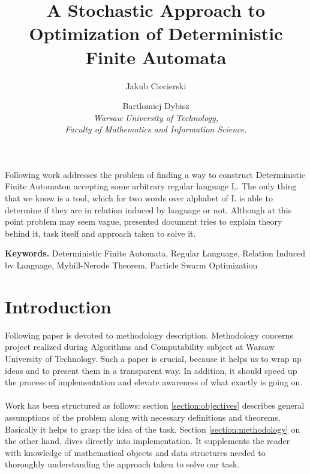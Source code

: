 \documentclass[runningheads,a4paper]{llncs}
\begin{document}
\vspace{-100pt}
\mainmatter

\title{A Stochastic Approach to Optimization of Deterministic Finite Automata}


\author{Jakub Ciecierski \and Bartlomiej Dybisz \\ 
\textit{Warsaw University of Technology,\\
Faculty of Mathematics and Information Science.}}




\maketitle

\abstract{} Following work addresses the problem of finding a way to construct Deterministic Finite Automaton accepting some arbitrary regular language L. The only thing that we know is a tool, which for two words over alphabet of L is able to determine if they are in relation induced by language or not. Although at this point problem may seem vague, presented document tries to explain theory behind it, task itself and approach taken to solve it. 

\smallskip
\noindent \textbf{Keywords.} Deterministic Finite Automata, Regular Language, Relation Induced bv Language, Myhill-Nerode Theorem, Particle Swarm Optimization


\section{Introduction}
Following paper is devoted to methodology description. Methodology concerns project realized during Algorithms and Computability subject at Warsaw University of Technology. Such a paper is crucial, because it helps us to wrap up ideas and to present them in a transparent way. In addition, it should speed up the process of implementation and elevate awareness of what exactly is going on.
\paragraph{}
Work has been structured as follows: section \ref{section:objectives} describes general assumptions of the problem along with necessary definitions and theorems. Basically it helps to grasp the idea of the task.
Section \ref{section:methodology} on the other hand, dives directly into implementation. It supplements the reader with knowledge of mathematical objects and data structures needed to thoroughly understanding the approach taken to solve our task. 
\end{document}
